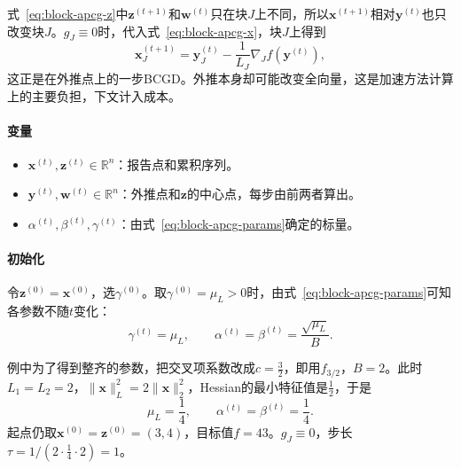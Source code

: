 式~\eqref{eq:block-apcg-z}中$\bm{z}^{(t+1)}$和$\bm{w}^{(t)}$只在块$J$上不同，所以$\bm{x}^{(t+1)}$相对$\bm{y}^{(t)}$也只改变块$J$。$g_J\equiv0$时，代入式~\eqref{eq:block-apcg-x}，块$J$上得到
\[
 \bm{x}_J^{(t+1)}=\bm{y}_J^{(t)}-\frac{1}{L_J}\nabla_Jf(\bm{y}^{(t)}),
\]
这正是在外推点上的一步BCGD。外推本身却可能改变全向量，这是加速方法计算上的主要负担，下文计入成本。

\paragraph{变量}
\begin{itemize}
 \item $\bm{x}^{(t)},\bm{z}^{(t)}\in\mathbb{R}^n$：报告点和累积序列。
 \item $\bm{y}^{(t)},\bm{w}^{(t)}\in\mathbb{R}^n$：外推点和$\bm{z}$的中心点，每步由前两者算出。
 \item $\alpha^{(t)},\beta^{(t)},\gamma^{(t)}$：由式~\eqref{eq:block-apcg-params}确定的标量。
\end{itemize}

\paragraph{初始化}
令$\bm{z}^{(0)}=\bm{x}^{(0)}$，选$\gamma^{(0)}$。取$\gamma^{(0)}=\mu_L>0$时，由式~\eqref{eq:block-apcg-params}可知各参数不随$t$变化：
\[
 \gamma^{(t)}=\mu_L,\qquad \alpha^{(t)}=\beta^{(t)}=\frac{\sqrt{\mu_L}}{B}.
\]

例中为了得到整齐的参数，把交叉项系数改成$c=\tfrac32$，即用$f_{3/2}$，$B=2$。此时$L_1=L_2=2$，$\lVert\bm{x}\rVert_L^2=2\lVert\bm{x}\rVert_2^2$，Hessian的最小特征值是$\tfrac12$，于是
\[
 \mu_L=\frac14,\qquad \alpha^{(t)}=\beta^{(t)}=\frac14 .
\]
起点仍取$\bm{x}^{(0)}=\bm{z}^{(0)}=(3,4)$，目标值$f=43$。$g_J\equiv0$，步长$\tau=1/(2\cdot\tfrac14\cdot2)=1$。


